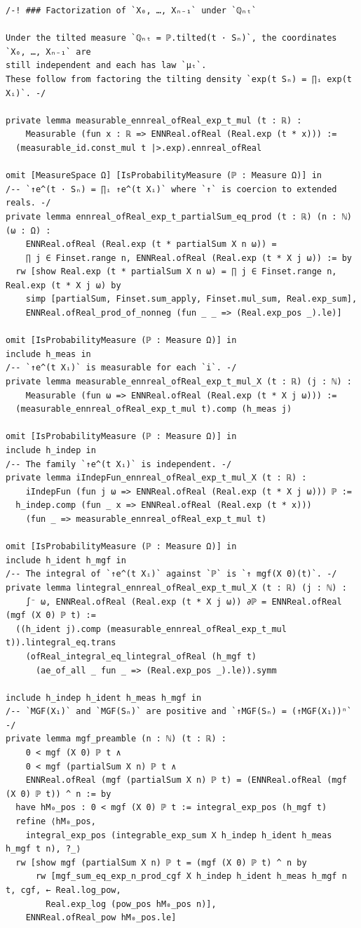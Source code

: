 \begin{lstlisting}
/-! ### Factorization of `X₀, …, Xₙ₋₁` under `ℚₙₜ`

Under the tilted measure `ℚₙₜ = ℙ.tilted(t · Sₙ)`, the coordinates `X₀, …, Xₙ₋₁` are
still independent and each has law `μₜ`.
These follow from factoring the tilting density `exp(t Sₙ) = ∏ᵢ exp(t Xᵢ)`. -/

private lemma measurable_ennreal_ofReal_exp_t_mul (t : ℝ) :
    Measurable (fun x : ℝ => ENNReal.ofReal (Real.exp (t * x))) :=
  (measurable_id.const_mul t |>.exp).ennreal_ofReal

omit [MeasureSpace Ω] [IsProbabilityMeasure (ℙ : Measure Ω)] in
/-- `↑e^(t · Sₙ) = ∏ᵢ ↑e^(t Xᵢ)` where `↑` is coercion to extended reals. -/
private lemma ennreal_ofReal_exp_t_partialSum_eq_prod (t : ℝ) (n : ℕ) (ω : Ω) :
    ENNReal.ofReal (Real.exp (t * partialSum X n ω)) =
    ∏ j ∈ Finset.range n, ENNReal.ofReal (Real.exp (t * X j ω)) := by
  rw [show Real.exp (t * partialSum X n ω) = ∏ j ∈ Finset.range n, Real.exp (t * X j ω) by
    simp [partialSum, Finset.sum_apply, Finset.mul_sum, Real.exp_sum],
    ENNReal.ofReal_prod_of_nonneg (fun _ _ => (Real.exp_pos _).le)]

omit [IsProbabilityMeasure (ℙ : Measure Ω)] in
include h_meas in
/-- `↑e^(t Xᵢ)` is measurable for each `i`. -/
private lemma measurable_ennreal_ofReal_exp_t_mul_X (t : ℝ) (j : ℕ) :
    Measurable (fun ω => ENNReal.ofReal (Real.exp (t * X j ω))) :=
  (measurable_ennreal_ofReal_exp_t_mul t).comp (h_meas j)

omit [IsProbabilityMeasure (ℙ : Measure Ω)] in
include h_indep in
/-- The family `↑e^(t Xᵢ)` is independent. -/
private lemma iIndepFun_ennreal_ofReal_exp_t_mul_X (t : ℝ) :
    iIndepFun (fun j ω => ENNReal.ofReal (Real.exp (t * X j ω))) ℙ :=
  h_indep.comp (fun _ x => ENNReal.ofReal (Real.exp (t * x)))
    (fun _ => measurable_ennreal_ofReal_exp_t_mul t)

omit [IsProbabilityMeasure (ℙ : Measure Ω)] in
include h_ident h_mgf in
/-- The integral of `↑e^(t Xᵢ)` against `ℙ` is `↑ mgf(X 0)(t)`. -/
private lemma lintegral_ennreal_ofReal_exp_t_mul_X (t : ℝ) (j : ℕ) :
    ∫⁻ ω, ENNReal.ofReal (Real.exp (t * X j ω)) ∂ℙ = ENNReal.ofReal (mgf (X 0) ℙ t) :=
  ((h_ident j).comp (measurable_ennreal_ofReal_exp_t_mul t)).lintegral_eq.trans
    (ofReal_integral_eq_lintegral_ofReal (h_mgf t)
      (ae_of_all _ fun _ => (Real.exp_pos _).le)).symm

include h_indep h_ident h_meas h_mgf in
/-- `MGF(X₁)` and `MGF(Sₙ)` are positive and `↑MGF(Sₙ) = (↑MGF(X₁))ⁿ` -/
private lemma mgf_preamble (n : ℕ) (t : ℝ) :
    0 < mgf (X 0) ℙ t ∧
    0 < mgf (partialSum X n) ℙ t ∧
    ENNReal.ofReal (mgf (partialSum X n) ℙ t) = (ENNReal.ofReal (mgf (X 0) ℙ t)) ^ n := by
  have hM₀_pos : 0 < mgf (X 0) ℙ t := integral_exp_pos (h_mgf t)
  refine ⟨hM₀_pos,
    integral_exp_pos (integrable_exp_sum X h_indep h_ident h_meas h_mgf t n), ?_⟩
  rw [show mgf (partialSum X n) ℙ t = (mgf (X 0) ℙ t) ^ n by
      rw [mgf_sum_eq_exp_n_prod_cgf X h_indep h_ident h_meas h_mgf n t, cgf, ← Real.log_pow,
        Real.exp_log (pow_pos hM₀_pos n)],
    ENNReal.ofReal_pow hM₀_pos.le]

\end{lstlisting}
